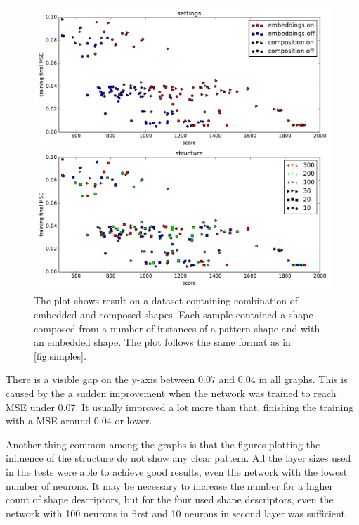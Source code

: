 \begin{figure}
\centering
\includegraphics[width=\linewidth]{ext/figure_x_cmb.pdf}
\caption{The plot shows result on a dataset containing combination of embedded and composed shapes. Each sample contained a shape composed from a number of instances of a pattern shape and with an embedded shape. The plot follows the same format as in \cref{fig:simples}.}
\label{fig:cmb}
\end{figure}

There is a visible gap on the y-axis between $0.07$ and $0.04$ in all graphs. This is caused by the a sudden improvement when the network was trained to reach MSE under 0.07. It usually improved a lot more than that, finishing the training with a MSE around 0.04 or lower.

Another thing common among the graphs is that the figures plotting the influence of the structure do not show any clear pattern. All the layer sizes used in the tests were able to achieve good results, even the network with the lowest number of neurons. It may be necessary to increase the number for a higher count of shape descriptors, but for the four used shape descriptors, even the network with 100 neurons in first and 10 neurons in second layer was sufficient.

